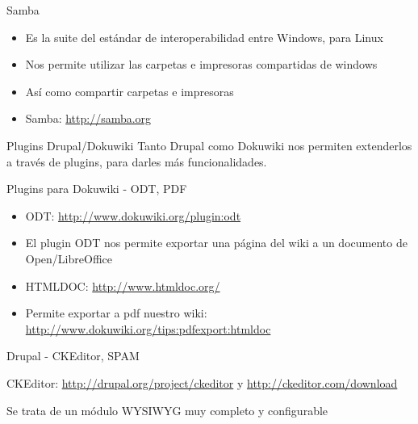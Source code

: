 \documentclass[spanish]{beamer}
\begin{document}

\begin{frame}{Samba}
\begin{itemize}
\item Es la suite del estándar de interoperabilidad entre Windows, para Linux
\item Nos permite utilizar las carpetas e impresoras compartidas de windows 
\item Así como compartir carpetas e impresoras
\item Samba: \url{http://samba.org}
\end{itemize}
\end{frame}

\begin{frame}{Plugins Drupal/Dokuwiki}
Tanto Drupal como Dokuwiki nos permiten extenderlos a través de plugins, para
 darles más funcionalidades.
\end{frame}

\begin{frame}{Plugins para Dokuwiki - ODT, PDF}
\begin{itemize}
\item ODT: \url{http://www.dokuwiki.org/plugin:odt}
\item El plugin ODT nos permite exportar una página del wiki a un documento de
 Open/LibreOffice
\item HTMLDOC: \url{http://www.htmldoc.org/} 
\item Permite exportar a pdf nuestro wiki: \url{http://www.dokuwiki.org/tips:pdfexport:htmldoc}
\end{itemize}
\end{frame}

\begin{frame}{Drupal - CKEditor, SPAM}
\item CKEditor: \url{http://drupal.org/project/ckeditor} y \url{http://ckeditor.com/download}
\item Se trata de un módulo WYSIWYG muy completo y configurable
\item 
\end{frame}
\end{document}
